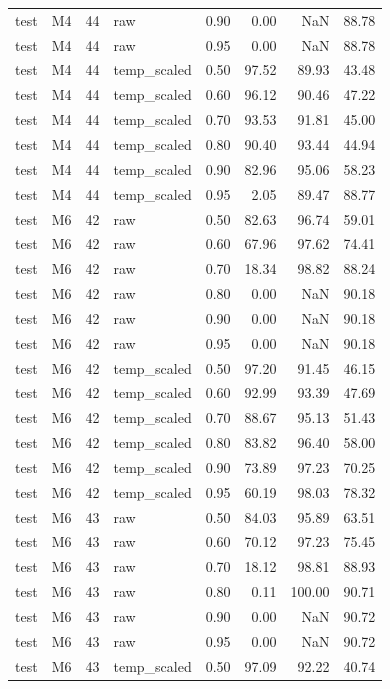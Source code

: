 \begin{tabular}{llrlrrrr}
test & M4 & 44 & raw & 0.90 & 0.00 & NaN & 88.78 \\
test & M4 & 44 & raw & 0.95 & 0.00 & NaN & 88.78 \\
test & M4 & 44 & temp\_scaled & 0.50 & 97.52 & 89.93 & 43.48 \\
test & M4 & 44 & temp\_scaled & 0.60 & 96.12 & 90.46 & 47.22 \\
test & M4 & 44 & temp\_scaled & 0.70 & 93.53 & 91.81 & 45.00 \\
test & M4 & 44 & temp\_scaled & 0.80 & 90.40 & 93.44 & 44.94 \\
test & M4 & 44 & temp\_scaled & 0.90 & 82.96 & 95.06 & 58.23 \\
test & M4 & 44 & temp\_scaled & 0.95 & 2.05 & 89.47 & 88.77 \\
test & M6 & 42 & raw & 0.50 & 82.63 & 96.74 & 59.01 \\
test & M6 & 42 & raw & 0.60 & 67.96 & 97.62 & 74.41 \\
test & M6 & 42 & raw & 0.70 & 18.34 & 98.82 & 88.24 \\
test & M6 & 42 & raw & 0.80 & 0.00 & NaN & 90.18 \\
test & M6 & 42 & raw & 0.90 & 0.00 & NaN & 90.18 \\
test & M6 & 42 & raw & 0.95 & 0.00 & NaN & 90.18 \\
test & M6 & 42 & temp\_scaled & 0.50 & 97.20 & 91.45 & 46.15 \\
test & M6 & 42 & temp\_scaled & 0.60 & 92.99 & 93.39 & 47.69 \\
test & M6 & 42 & temp\_scaled & 0.70 & 88.67 & 95.13 & 51.43 \\
test & M6 & 42 & temp\_scaled & 0.80 & 83.82 & 96.40 & 58.00 \\
test & M6 & 42 & temp\_scaled & 0.90 & 73.89 & 97.23 & 70.25 \\
test & M6 & 42 & temp\_scaled & 0.95 & 60.19 & 98.03 & 78.32 \\
test & M6 & 43 & raw & 0.50 & 84.03 & 95.89 & 63.51 \\
test & M6 & 43 & raw & 0.60 & 70.12 & 97.23 & 75.45 \\
test & M6 & 43 & raw & 0.70 & 18.12 & 98.81 & 88.93 \\
test & M6 & 43 & raw & 0.80 & 0.11 & 100.00 & 90.71 \\
test & M6 & 43 & raw & 0.90 & 0.00 & NaN & 90.72 \\
test & M6 & 43 & raw & 0.95 & 0.00 & NaN & 90.72 \\
test & M6 & 43 & temp\_scaled & 0.50 & 97.09 & 92.22 & 40.74 \\

\end{tabular}
